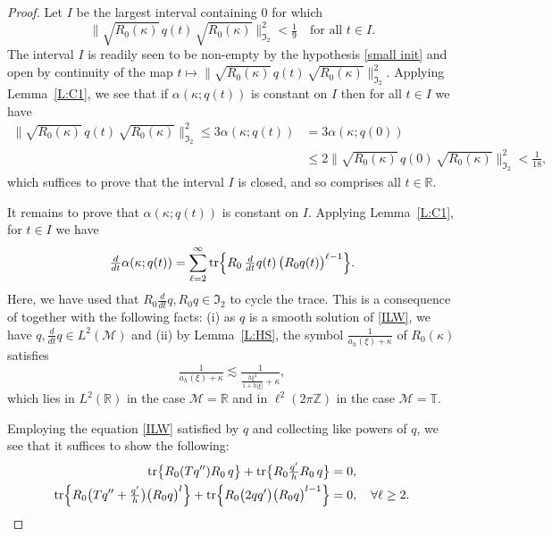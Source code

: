 \documentclass{amsart}
\newcommand{\I}{{\mathfrak{I}}}
\newcommand{\R}{{\mathbb{R}}}
\newcommand{\T}{{\mathbb{T}}}
\newcommand{\Z}{{\mathbb{Z}}}
\DeclareMathOperator{\tr}{tr}
\theoremstyle{definition}
\theoremstyle{remark}
\begin{document}
\begin{proof}
Let \(I\) be the largest interval containing \(0\) for which
\[
\| \sqrt{R_0(\kappa)}\, q(t)\, \sqrt{R_0(\kappa)}\|_{\mathfrak I_2}^2<\tfrac19\quad\text{for all \(t\in I\)}.
\]
The interval \(I\) is readily seen to be non-empty by the hypothesis \eqref{small init} and open by continuity of the map \(t\mapsto \| \sqrt{R_0(\kappa)}\, q(t)\, \sqrt{R_0(\kappa)}\|_{\mathfrak I_2}^2\). Applying Lemma~\ref{L:C1}, we see that if \(\alpha(\kappa;q(t))\) is constant on \(I\) then for all \(t\in I\) we have
\begin{align*}
\| \sqrt{R_0(\kappa)}\, q(t)\, \sqrt{R_0(\kappa)}\|_{\mathfrak I_2}^2\leq 3\alpha(\kappa;q(t)) &= 3\alpha(\kappa;q(0))\\
&\leq 2\| \sqrt{R_0(\kappa)}\, q(0)\, \sqrt{R_0(\kappa)}\|_{\mathfrak I_2}^2<\tfrac1{18},
\end{align*}
which suffices to prove that the interval \(I\) is closed, and so comprises all \(t\in \R\).

It remains to prove that \(\alpha(\kappa;q(t))\) is constant on \(I\).  Applying Lemma~\ref{L:C1}, for \(t\in I\) we have
\begin{align}\label{dt KdValpha}
\tfrac{d }{dt} \alpha(\kappa;q(t)) = \sum_{\ell=2}^\infty \tr\Bigl\{ R_0\, \tfrac{d }{dt}q(t)\, \bigl(R_0 q(t)\bigr)^{\ell-1}\Bigr\}.
\end{align}
Here, we have used that \(R_0\frac d{dt}q,R_0q\in \I_2\) to cycle the trace. This is a consequence of \cite[Theorem 4.1]{MR2154153} together with the following facts: (i) as \(q\) is a smooth solution of \eqref{ILW}, we have \(q,\frac d{dt}q\in L^2(\mathcal M)\) and (ii) by Lemma~\ref{L:HS}, the symbol \(\frac1{a_h(\xi)+\kappa}\) of \(R_0(\kappa)\) satisfies
\[
\tfrac1{a_h(\xi)+\kappa}\lesssim \tfrac1{\frac{h\xi^2}{1+h|\xi|}+\kappa},
\]
which lies in \(L^2(\R)\) in the case \(\mathcal M = \R\) and in \(\ell^2(2\pi \Z)\) in the case \(\mathcal M = \T\).

Employing the equation \eqref{ILW} satisfied by $q$ and collecting like powers of $q$, we see that it suffices to show the following:
\begin{align}
\tr\bigl\{  R_0 (Tq'') R_0 \,q\bigr\} + \tr\bigl\{ R_0 \tfrac{q'}{h} R_0 \,q\bigr\}&=0, \label{E:quadratic}\\
\tr\Bigl\{ R_0  \bigl(Tq''+ \tfrac{q'}{h}\bigr)\bigl(R_0 q\bigr)^{l}\Bigr\}  +  \tr\Bigl\{ R_0\bigl(2 q q'\bigr)\bigl(R_0 q\bigr)^{l-1}\Bigr\}&=0, \quad\forall \ell\geq 2.\label{E:telescope}
\end{align}


\end{proof}
\end{document}
